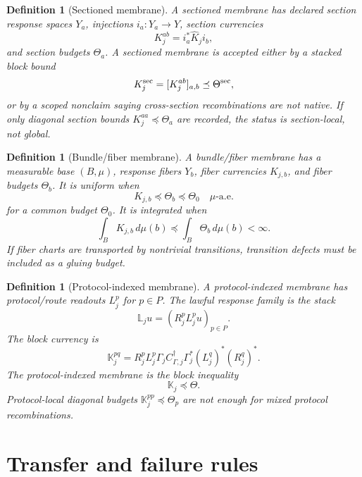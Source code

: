 \documentclass[11pt]{article}
\newtheorem{definition}[theorem]{Definition}
\begin{document}
\begin{definition}[Sectioned membrane]
A \emph{sectioned membrane} has declared section response spaces \(Y_a\), injections \(i_a:Y_a\to Y\), section currencies
\[
  K_j^{ab}=i_a^*\widehat K_ji_b,
\]
and section budgets \(\Theta_a\). A sectioned membrane is accepted either by a stacked block bound
\begin{equation}\label{eq:section-stack}
  K_j^{\rm sec}=[K_j^{ab}]_{a,b}\preceq\Theta^{\rm sec},
\end{equation}
or by a scoped nonclaim saying cross-section recombinations are not native. If only diagonal section bounds \(K_j^{aa}\preceq\Theta_a\) are recorded, the status is section-local, not global.
\end{definition}

\begin{definition}[Bundle/fiber membrane]
A \emph{bundle/fiber membrane} has a measurable base \((B,\mu)\), response fibers \(Y_b\), fiber currencies \(K_{j,b}\), and fiber budgets \(\Theta_b\). It is uniform when
\begin{equation}\label{eq:uniform-bundle}
  K_{j,b}\preceq\Theta_b\preceq\Theta_0\quad\mu\text{-a.e.}
\end{equation}
for a common budget \(\Theta_0\). It is integrated when
\begin{equation}\label{eq:integrated-bundle}
  \int_B K_{j,b}\,d\mu(b)\preceq \int_B\Theta_b\,d\mu(b)<\infty.
\end{equation}
If fiber charts are transported by nontrivial transitions, transition defects must be included as a gluing budget.
\end{definition}

\begin{definition}[Protocol-indexed membrane]
A \emph{protocol-indexed membrane} has protocol/route readouts \(L_j^p\) for \(p\in P\). The lawful response family is the stack
\[
  \mathbb L_j u=(R_j^pL_j^pu)_{p\in P}.
\]
The block currency is
\begin{equation}\label{eq:protocol-block}
  \mathbb K_j^{pq}=R_j^pL_j^p\Gamma_jC_{\Gamma,j}^\dagger\Gamma_j^*(L_j^q)^*(R_j^q)^*.
\end{equation}
The protocol-indexed membrane is the block inequality
\[
  \mathbb K_j\preceq\mathbb\Theta.
\]
Protocol-local diagonal budgets \(\mathbb K_j^{pp}\preceq\Theta_p\) are not enough for mixed protocol recombinations.
\end{definition}

\section{Transfer and failure rules}
\end{document}
